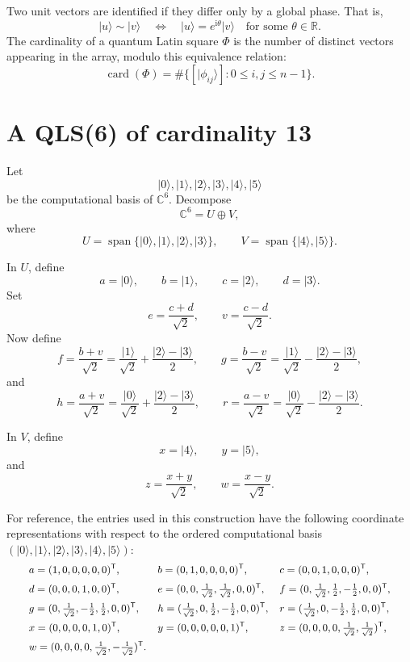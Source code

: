 \documentclass[a4paper,11pt]{article}
\newcommand{\C}{\mathbb{C}}
\newcommand{\ket}[1]{\lvert #1\rangle}
\newcommand{\card}{\operatorname{card}}
\begin{document}
Two unit vectors are identified if they differ only by a global phase. That is,
\[
  \ket{u}\sim \ket{v}
  \quad\Longleftrightarrow\quad
  \ket{u}=e^{\mathrm i\theta}\ket{v}
  \quad\text{for some }\theta\in\mathbb R.
\]
The cardinality of a quantum Latin square $\Phi$ is the number of distinct
vectors appearing in the array, modulo this equivalence relation:
\[
  \card(\Phi)=\#\{[\ket{\phi_{ij}}]:0\leq i,j\leq n-1\}.
\]

\section{A QLS(6) of cardinality 13}

Let
\[
  \ket{0},\ket{1},\ket{2},\ket{3},\ket{4},\ket{5}
\]
be the computational basis of $\C^6$. Decompose
\[
  \C^6=U\oplus V,
\]
where
\[
  U=\operatorname{span}\{\ket{0},\ket{1},\ket{2},\ket{3}\},
  \qquad
  V=\operatorname{span}\{\ket{4},\ket{5}\}.
\]

In $U$, define
\[
  a=\ket{0},\qquad b=\ket{1},\qquad c=\ket{2},\qquad d=\ket{3}.
\]
Set
\[
  e=\frac{c+d}{\sqrt2},
  \qquad
  v=\frac{c-d}{\sqrt2}.
\]
Now define
\[
  f=\frac{b+v}{\sqrt2}
   =\frac{\ket{1}}{\sqrt2}+\frac{\ket{2}-\ket{3}}{2},
  \qquad
  g=\frac{b-v}{\sqrt2}
   =\frac{\ket{1}}{\sqrt2}-\frac{\ket{2}-\ket{3}}{2},
\]
and
\[
  h=\frac{a+v}{\sqrt2}
   =\frac{\ket{0}}{\sqrt2}+\frac{\ket{2}-\ket{3}}{2},
  \qquad
  r=\frac{a-v}{\sqrt2}
   =\frac{\ket{0}}{\sqrt2}-\frac{\ket{2}-\ket{3}}{2}.
\]

In $V$, define
\[
  x=\ket{4},
  \qquad
  y=\ket{5},
\]
and
\[
  z=\frac{x+y}{\sqrt2},
  \qquad
  w=\frac{x-y}{\sqrt2}.
\]


For reference, the entries used in this construction have the following
coordinate representations with respect to the ordered computational basis
$(\ket{0},\ket{1},\ket{2},\ket{3},\ket{4},\ket{5})$:
\[
\small
\begin{array}{lll}
 a=(1,0,0,0,0,0)^{\mathsf T},
& b=(0,1,0,0,0,0)^{\mathsf T},
& c=(0,0,1,0,0,0)^{\mathsf T},\\[2mm]
 d=(0,0,0,1,0,0)^{\mathsf T},
& e=(0,0,\frac1{\sqrt2},\frac1{\sqrt2},0,0)^{\mathsf T},
& f=(0,\frac1{\sqrt2},\frac12,-\frac12,0,0)^{\mathsf T},\\[2mm]
 g=(0,\frac1{\sqrt2},-\frac12,\frac12,0,0)^{\mathsf T},
& h=(\frac1{\sqrt2},0,\frac12,-\frac12,0,0)^{\mathsf T},
& r=(\frac1{\sqrt2},0,-\frac12,\frac12,0,0)^{\mathsf T},\\[2mm]
 x=(0,0,0,0,1,0)^{\mathsf T},
& y=(0,0,0,0,0,1)^{\mathsf T},
& z=(0,0,0,0,\frac1{\sqrt2},\frac1{\sqrt2})^{\mathsf T},\\[2mm]
 w=(0,0,0,0,\frac1{\sqrt2},-\frac1{\sqrt2})^{\mathsf T}.&&
\end{array}
\]
\end{document}
